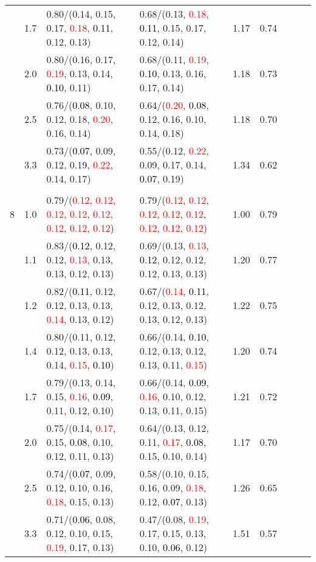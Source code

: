 \documentclass[10pt,a4paper]{report}
\begin{document}
\begin{table}[!htbp]
\begin{center}
{\begin{tabular}{ccllccccc}
			&1.7&0.80/(0.14, 0.15, 0.17, \textcolor{red}{0.18}, \textcolor{black}{0.11}, 0.12, 0.13)&0.68/(0.13, \textcolor{red}{0.18}, \textcolor{black}{0.11}, 0.15, 0.17, 0.12, 0.14)&1.17&0.74\\
			&2.0&0.80/(0.16, 0.17, \textcolor{red}{0.19}, 0.13, 0.14, \textcolor{black}{0.10}, 0.11)&0.68/(0.11, \textcolor{red}{0.19}, \textcolor{black}{0.10}, 0.13, 0.16, 0.17, 0.14)&1.18&0.73\\
			&2.5&0.76/(\textcolor{black}{0.08}, 0.10, 0.12, 0.18, \textcolor{red}{0.20}, 0.16, 0.14)&0.64/(\textcolor{red}{0.20}, \textcolor{black}{0.08}, 0.12, 0.16, 0.10, 0.14, 0.18)&1.18&0.70\\
			&3.3&0.73/(\textcolor{black}{0.07}, 0.09, 0.12, 0.19, \textcolor{red}{0.22}, 0.14, 0.17)&0.55/(0.12, \textcolor{red}{0.22}, 0.09, 0.17, 0.14, \textcolor{black}{0.07}, 0.19)&1.34&0.62\\
			&&&&\\
			8			&1.0&0.79/(\textcolor{red}{0.12}, \textcolor{red}{0.12}, \textcolor{red}{0.12}, \textcolor{red}{0.12}, \textcolor{red}{0.12}, \textcolor{red}{0.12}, \textcolor{red}{0.12}, \textcolor{red}{0.12})&0.79/(\textcolor{red}{0.12}, \textcolor{red}{0.12}, \textcolor{red}{0.12}, \textcolor{red}{0.12}, \textcolor{red}{0.12}, \textcolor{red}{0.12}, \textcolor{red}{0.12}, \textcolor{red}{0.12})&1.00&0.79\\
			&1.1&0.83/(\textcolor{black}{0.12}, 0.12, 0.12, \textcolor{red}{0.13}, 0.13, 0.13, 0.12, 0.13)&0.69/(0.13, \textcolor{red}{0.13}, \textcolor{black}{0.12}, 0.12, 0.12, 0.12, 0.13, 0.13)&1.20&0.77\\
			&1.2&0.82/(\textcolor{black}{0.11}, 0.12, 0.12, 0.13, 0.13, \textcolor{red}{0.14}, 0.13, 0.12)&0.67/(\textcolor{red}{0.14}, \textcolor{black}{0.11}, 0.12, 0.13, 0.12, 0.13, 0.12, 0.13)&1.22&0.75\\
			&1.4&0.80/(0.11, 0.12, 0.12, 0.13, 0.13, 0.14, \textcolor{red}{0.15}, \textcolor{black}{0.10})&0.66/(0.14, \textcolor{black}{0.10}, 0.12, 0.13, 0.12, 0.13, 0.11, \textcolor{red}{0.15})&1.20&0.74\\
			&1.7&0.79/(0.13, 0.14, 0.15, \textcolor{red}{0.16}, \textcolor{black}{0.09}, 0.11, 0.12, 0.10)&0.66/(0.14, \textcolor{black}{0.09}, \textcolor{red}{0.16}, 0.10, 0.12, 0.13, 0.11, 0.15)&1.21&0.72\\
			&2.0&0.75/(0.14, \textcolor{red}{0.17}, 0.15, \textcolor{black}{0.08}, 0.10, 0.12, 0.11, 0.13)&0.64/(0.13, 0.12, 0.11, \textcolor{red}{0.17}, \textcolor{black}{0.08}, 0.15, 0.10, 0.14)&1.17&0.70\\
			&2.5&0.74/(\textcolor{black}{0.07}, 0.09, 0.12, 0.10, 0.16, \textcolor{red}{0.18}, 0.15, 0.13)&0.58/(0.10, 0.15, 0.16, 0.09, \textcolor{red}{0.18}, 0.12, \textcolor{black}{0.07}, 0.13)&1.26&0.65\\
			&3.3&0.71/(\textcolor{black}{0.06}, 0.08, 0.12, 0.10, 0.15, \textcolor{red}{0.19}, 0.17, 0.13)&0.47/(0.08, \textcolor{red}{0.19}, 0.17, 0.15, 0.13, 0.10, \textcolor{black}{0.06}, 0.12)&1.51&0.57\\
			\bottomrule
		\end{tabular}}
	\end{center}
\end{table}
\end{document}
